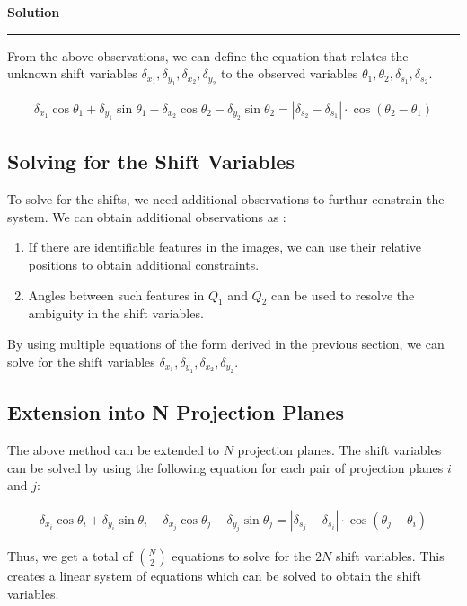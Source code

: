 \documentclass[a4paper,12pt]{article}
\newenvironment{solution}[2][]{%
    \begin{mdframed}[linecolor=blue!70!black, linewidth=2pt, roundcorner=10pt, backgroundcolor=yellow!10!white, skipabove=12pt, skipbelow=12pt]%
        \textbf{\large #2}
        \par\noindent\rule{\textwidth}{0.4pt}
}{
    \end{mdframed}
}
\begin{document}
\begin{solution}{Solution}
\noindent From the above observations, we can define the equation that relates the unknown shift variables $\delta_{x_1}, \delta_{y_1}, \delta_{x_2}, \delta_{y_2}$ to the observed variables $\theta_1, \theta_2, \delta_{s_1}, \delta_{s_2}$.

\begin{align*}
    \delta_{x_1} \cos \theta_1 + \delta_{y_1} \sin \theta_1  - \delta_{x_2} \cos \theta_2 - \delta_{y_2} \sin \theta_2 = |\delta_{s_2} - \delta_{s_1}|\cdot \cos(\theta_2 - \theta_1)
\end{align*}

\subsection{Solving for the Shift Variables}

\noindent To solve for the shifts, we need additional observations to furthur constrain the system. We can obtain additional observations as :

\begin{enumerate}
  \item If there are identifiable features in the images, we can use their relative positions to obtain additional constraints.
  \item Angles between such features in $Q_1$ and $Q_2$ can be used to resolve the ambiguity in the shift variables.
\end{enumerate}

\noindent By using multiple equations of the form derived in the previous section, we can solve for the shift variables $\delta_{x_1}, \delta_{y_1}, \delta_{x_2}, \delta_{y_2}$.

\subsection{Extension into N Projection Planes}

\noindent The above method can be extended to $N$ projection planes. The shift variables can be solved by using the following equation for each pair of projection planes $i$ and $j$:

\begin{align*}
    \delta_{x_i} \cos \theta_i + \delta_{y_i} \sin \theta_i  - \delta_{x_j} \cos \theta_j - \delta_{y_j} \sin \theta_j = |\delta_{s_j} - \delta_{s_i}|\cdot \cos(\theta_j - \theta_i)
\end{align*}

\noindent Thus, we get a total of $\binom{N}{2}$ equations to solve for the $2N$ shift variables. This creates a linear system of equations which can be solved to obtain the shift variables.

\end{solution}
\end{document}
